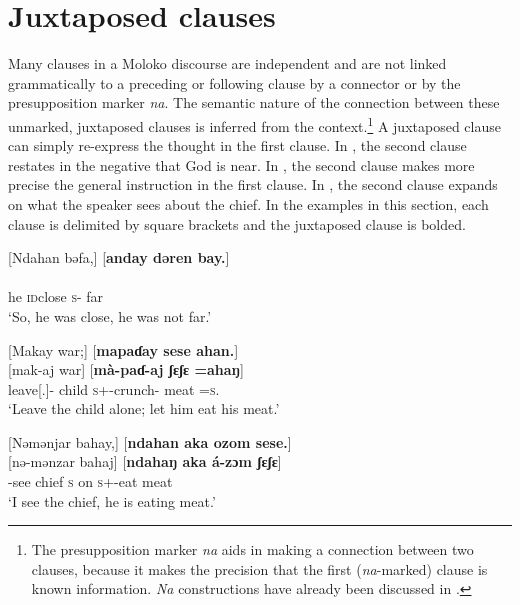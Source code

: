 \section{Juxtaposed clauses}\label{sec:12.4}
\hypertarget{RefHeading1213521525720847}{}
Many clauses in a Moloko discourse are independent and are not linked grammatically to a preceding or following clause by a connector or by the presupposition marker \textit{na}. The semantic nature of the connection between these unmarked, \nohyphens{juxtaposed} clauses is inferred from the context.\footnote{The presupposition marker \textit{na} aids in making a connection between two clauses, because it makes the precision that the first (\textit{na}{}-marked) clause is known information. \textit{Na} constructions have already been discussed in .}  A juxtaposed clause can simply re-express the thought in the first clause. In , the second clause restates in the negative that God is near. In , the second clause makes more precise the general instruction in the first clause. In , the second clause expands on what the speaker sees about the chief. In the examples in this section, each clause is delimited by square brackets and the juxtaposed clause is bolded.

\ea \label{ex:12:62}
{}[Ndahan  bəfa,]  [\textbf{anday  dəren  bay.}] \\
\\
      he  \textsc{id}close   {\textsc{s}-{\PROG}}  far  {\NEG}\\
\glt  ‘So, he was close, he was not far.’
\z 

\ea \label{ex:12:63}
{}[Makay  war;]  [\textbf{mapaɗay  sese  ahan.}]\\
\gll  {}[mak-aj war] [\textbf{mà-paɗ-aj ʃɛʃɛ =ahaŋ}]\\
      leave[{\twoS}.{\IMP}]-{\CL}  {child}  \textsc{s}+{\HOR}-crunch-{\CL}  {meat}  =\textsc{s}.{\POSS}\\
\glt  ‘Leave the child alone; let him eat his meat.’ 
\z 

\clearpage
\ea \label{ex:12:64}
{}[Nəmənjar  bahay,]  [\textbf{ndahan  aka  ozom  sese.}]\\
\gll  {}[nə-mənzar bahaj]  [\textbf{ndahaŋ aka á-zɔm ʃɛʃɛ}]\\
      {\oneS}-see  chief  \textsc{s}  on  \textsc{s}+{\IFV}-eat  meat\\
\glt  ‘I see the chief, he is eating meat.’ 
\z 


